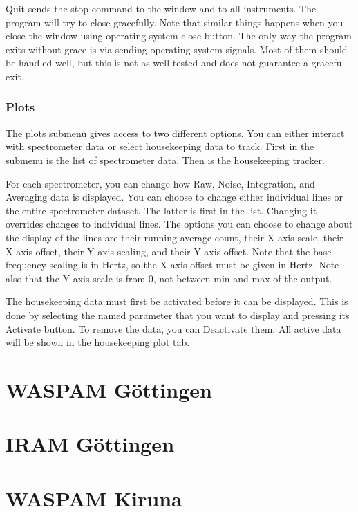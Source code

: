 \documentclass[a4paper,10pt]{book}
\begin{document}
Quit sends the stop command to the window and to all instruments.  The program will try to close gracefully.  Note that similar things happens when you close the window using operating system close button.  The only way the program exits without grace is via sending operating system signals.  Most of them should be handled well, but this is not as well tested and does not guarantee a graceful exit.

\subsubsection{Plots}
The plots submenu gives access to two different options.  You can either interact with
spectrometer data or select housekeeping data to track.  First in the submenu is the list of spectrometer data.  Then is the housekeeping tracker.

For each spectrometer, you can change how  Raw,  Noise, Integration, and Averaging data is displayed.  You can choose to change either individual lines or the entire spectrometer dataset.  The latter is first in the list.  
Changing it overrides changes to individual lines. The options you can choose to change about the display of the lines are their running average count, their X-axis scale, their X-axis offset, their Y-axis scaling, and their Y-axis offset.  Note that the base frequency scaling is in Hertz, so the X-axis offset must be given in Hertz.  Note also that the Y-axis scale is from 0, not between min and max of the output.

The housekeeping data must first be activated before it can be displayed.  This is done by selecting the named parameter that you want to display and pressing its Activate button.  To remove the data, you can Deactivate them.  All active data will be shown in the housekeeping plot tab.

\section{WASPAM Göttingen}
\section{IRAM Göttingen}
\section{WASPAM Kiruna}

\newpage

 

\printindex
\end{document}

